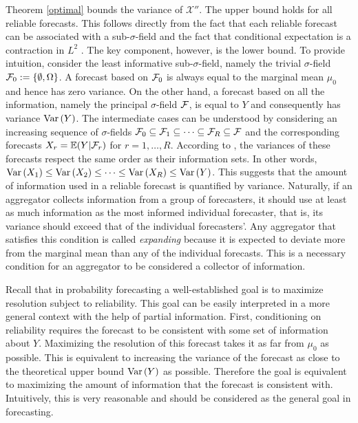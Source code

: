 \documentclass[11pt]{article}
\newcommand{\E}{\mathbb{E}}
\theoremstyle{definition}
\theoremstyle{definition}
\def\F{{\cal F}}
\def\E{{\mathbb E}}
\def\Var{{\rm Var}\,}
\begin{document}
Theorem \ref{optimal} bounds the variance of $\mathcal{X}''$. The upper bound holds for all reliable forecasts. This follows directly from the fact that each reliable forecast can be associated with a sub-$\sigma$-field and the fact that conditional expectation is a contraction in $L^2$ \citep[Theorem 5.1.4.]{durrett2010probability}. The key component, however, is the lower bound.
To provide intuition, consider the least informative sub-$\sigma$-field, namely the trivial $\sigma$-field $\F_0 := \{\emptyset, \Omega\}$. A forecast based on $\F_0$ is always equal to the marginal mean $\mu_0$ and hence has zero variance. On the other hand, a forecast based on all the information, namely the principal $\sigma$-field $\F$, is equal to $Y$ and consequently has variance $\Var(Y)$. 
The intermediate cases can be understood by considering an increasing sequence of $\sigma$-fields $\F_0 \subseteq \F_1 \subseteq \dots \subseteq \F_R \subseteq \F$ and the corresponding forecasts $X_r = \E(Y|\F_r)$ for $r = 1, \dots, R$. According to \citet[Proposition 2.1]{satopaamodeling2}, the variances of these forecasts respect the same order as their information sets. In other words, $\Var(X_1) \leq \Var(X_2) \leq \dots \leq \Var(X_R) \leq \Var(Y)$. This suggests that the amount of information used in a reliable forecast is quantified by variance. Naturally, if an aggregator collects information from a group of forecasters, it should use at least as much information as the most informed individual forecaster, that is, its variance should exceed that of the individual forecasters'. Any aggregator that satisfies this condition is called \textit{expanding} because it is expected to deviate more from the marginal mean than any of the individual forecasts. This is a necessary condition for an aggregator to be considered a collector of information. 


Recall that in probability forecasting a well-established goal is to maximize resolution subject to reliability. This goal can be easily interpreted in a more general context with the help of partial information. First, conditioning on reliability requires the forecast to be consistent with some set of information about $Y$. Maximizing the resolution of this forecast takes it as far from $\mu_0$ as possible. This is equivalent to increasing the variance of the forecast as close to the theoretical upper bound $\Var(Y)$ as possible. Therefore the goal is equivalent to maximizing the amount of information that the forecast is consistent with. Intuitively, this is very reasonable and should be considered as the general goal in forecasting.
\end{document}
